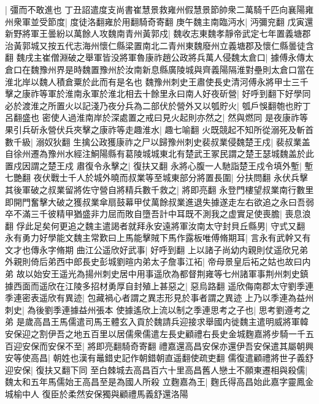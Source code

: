 |{
	彊而不敢進也}
丁丑詔遣度支尚書崔慧景救雍州假慧景節帥衆二萬騎千匹向襄陽雍州衆軍並受節度|{
	度徒洛翻雍於用翻騎奇寄翻}
庚午魏主南臨沔水|{
	沔彌兖翻}
戊寅還新野將軍王曇紛以萬餘人攻魏南青州黃郭戍|{
	魏收志東魏孝靜帝武定七年置義塘郡治黃郭城又按五代志海州懷仁縣梁置南北二青州東魏廢州立義塘郡及懷仁縣曇徒含翻}
魏戌主崔僧淵破之舉軍皆没將軍魯康祚趙公政將兵萬人侵魏太倉口|{
	據傅永傳太倉口在魏豫州界是時魏置豫州於汝南新息縣廣陵城與齊義陽隔淮對壘則太倉口當在淮北岸以魏人積倉粟於此而有是名也}
魏豫州刺史王肅使長史清河傅永將甲士三千擊之康祚等軍於淮南永軍於淮北相去十餘里永曰南人好夜斫營|{
	好呼到翻下好學同}
必於渡淮之所置火以記淺乃夜分兵為二部伏於營外又以瓠貯火|{
	瓠戶悞翻匏也貯丁呂翻盛也}
密使人過淮南岸於深處置之戒曰見火起則亦然之|{
	然與燃同}
是夜康祚等果引兵斫永營伏兵夾擊之康祚等走趣淮水|{
	趣七喻翻}
火既競起不知所從溺死及斬首數千級|{
	溺奴狄翻}
生擒公政獲康祚之尸以歸豫州刺史裴叔業侵魏楚王戍|{
	裴叔業盖自徐州遷為豫州水經注鮦陽縣有葛陵城城東北有楚武王冢民謂之楚王瑟城魏盖於此置戍因謂之楚王戍}
肅復令永擊之|{
	復扶又翻}
永將心腹一人馳詣楚王戍令填外塹|{
	塹七艷翻}
夜伏戰士千人於城外曉而叔業等至城東部分將置長圍|{
	分扶問翻}
永伏兵擊其後軍破之叔業留將佐守營自將精兵數千救之|{
	將即亮翻}
永登門樓望叔業南行數里即開門奮擊大破之獲叔業傘扇鼓幕甲仗萬餘叔業進退失據遂走左右欲追之永曰吾弱卒不滿三千彼精甲猶盛非力屈而敗自墮吾計中耳既不測我之虚實足使喪膽|{
	喪息浪翻}
俘此足矣何更追之魏主遣謁者就拜永安遠將軍汝南太守封貝丘縣男|{
	守式又翻}
永有勇力好學能文魏主常歎曰上馬能擊賊下馬作露板唯傅脩期耳|{
	言永有武幹又有文才也傳永字脩期}
曲江公遥欣好武事|{
	好呼到翻}
上以諸子尚幼内親則仗遥欣兄弟外親則倚后弟西中郎長史彭城劉暄内弟太子詹事江袥|{
	帝母景皇后袥之姑也故曰内弟}
故以始安王遥光為揚州刺史居中用事遥欣為都督荆雍等七州諸軍事荆州刺史鎮據西面而遥欣在江陵多招材勇厚自封殖上甚惡之|{
	惡烏路翻}
遥欣侮南郡太守劉季連季連密表遥欣有異迹|{
	包藏禍心者謂之異志形見於事者謂之異迹}
上乃以季連為益州刺史|{
	為後劉季連據益州張本}
使據遙欣上流以制之季連思考之子也|{
	思考劉遵考之弟}
是歲高昌王馬儒遣司馬王體玄入貢於魏請兵迎接求舉國内徙魏主遣明威將軍韓安保迎之割伊吾之地五百里以居儒衆儒遣左長史顧禮右長史金城麴嘉將步騎一千五百迎安保而安保不至|{
	將即亮翻騎奇寄翻}
禮嘉還高昌安保亦還伊吾安保遣其屬朝興安等使高昌|{
	朝姓也漢有鼂錯史記作朝錯朝直遥翻使疏吏翻}
儒復遣顧禮將世子義舒迎安保|{
	復扶又翻下同}
至白棘城去高昌百六十里高昌舊人戀土不願東遷相與殺儒|{
	魏太和五年馬儒始王高昌至是為國人所殺}
立麴嘉為王|{
	麴氏得高昌始此嘉字靈鳳金城榆中人}
復臣於柔然安保獨與顧禮馬義舒還洛陽

